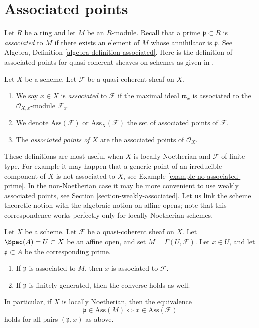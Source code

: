 \section{Associated points}
\label{section-associated}

\noindent
Let $R$ be a ring and let $M$ be an $R$-module.
Recall that a prime $\mathfrak p \subset R$ is {\it associated} to $M$
if there exists an element of $M$ whose annihilator is $\mathfrak p$.
See Algebra, Definition \ref{algebra-definition-associated}.
Here is the definition of associated points
for quasi-coherent sheaves on schemes
as given in \cite[IV Definition 3.1.1]{EGA}.

\begin{definition}
\label{definition-associated}
Let $X$ be a scheme.
Let $\mathcal{F}$ be a quasi-coherent sheaf on $X$.
\begin{enumerate}
\item We say $x \in X$ is {\it associated} to $\mathcal{F}$
if the maximal ideal
$\mathfrak m_x$ is associated to the $\mathcal{O}_{X, x}$-module
$\mathcal{F}_x$.
\item We denote $\text{Ass}(\mathcal{F})$ or $\text{Ass}_X(\mathcal{F})$
the set of associated points of $\mathcal{F}$.
\item The {\it associated points of $X$} are the associated
points of $\mathcal{O}_X$.
\end{enumerate}
\end{definition}

\noindent
These definitions are most useful when $X$ is locally Noetherian
and $\mathcal{F}$ of finite type.
For example it may happen that a generic point of an irreducible
component of $X$ is not associated to $X$, see
Example \ref{example-no-associated-prime}.
In the non-Noetherian case it may be more convenient to use weakly
associated points, see
Section \ref{section-weakly-associated}.
Let us link the scheme theoretic notion with the algebraic notion
on affine opens; note that this correspondence works perfectly only
for locally Noetherian schemes.

\begin{lemma}
\label{lemma-associated-affine-open}
Let $X$ be a scheme. Let $\mathcal{F}$ be a quasi-coherent sheaf on $X$.
Let $\Spec(A) = U \subset X$ be an affine open, and set
$M = \Gamma(U, \mathcal{F})$.
Let $x \in U$, and let $\mathfrak p \subset A$ be the corresponding prime.
\begin{enumerate}
\item If $\mathfrak p$ is associated to $M$, then $x$ is associated
to $\mathcal{F}$.
\item If $\mathfrak p$ is finitely generated, then the converse holds
as well.
\end{enumerate}
In particular, if $X$ is locally Noetherian, then the equivalence
$$
\mathfrak p \in \text{Ass}(M) \Leftrightarrow x \in \text{Ass}(\mathcal{F})
$$
holds for all pairs $(\mathfrak p, x)$ as above.
\end{lemma}


